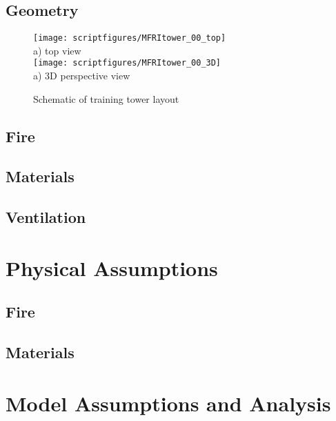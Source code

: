 \documentclass[11pt]{book}
\begin{document}
\subsection{Geometry}


\begin{figure}[\figoptions]
\begin{center}
\texttt{[image: scriptfigures/MFRItower\_00\_top]}\\
a) top view\\
\texttt{[image: scriptfigures/MFRItower\_00\_3D]}\\
a) 3D perspective view\\
\end{center}
\caption {Schematic of training tower layout}
\label{figflashoverplan}%
\end{figure}
\subsection{Fire}

\subsection{Materials}

\subsection{Ventilation}

\section{Physical Assumptions}
\subsection{Fire}

\subsection{Materials}

\section{Model Assumptions and Analysis}
\end{document}
